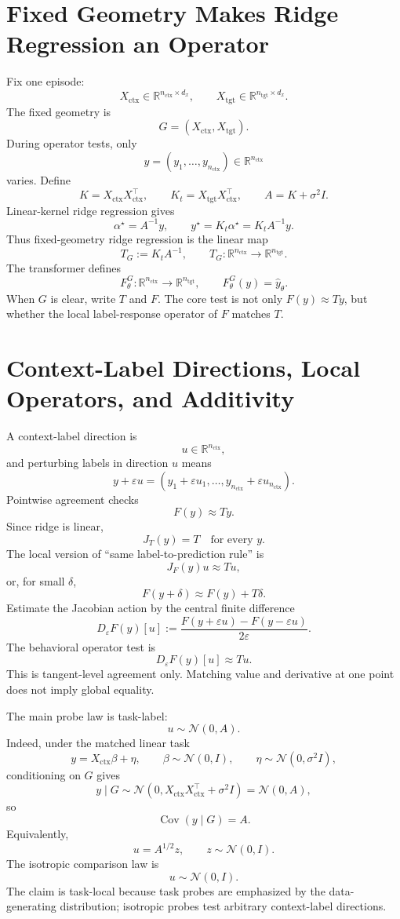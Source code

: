 \documentclass[11pt]{article}
\newcommand{\R}{\mathbb{R}}
\newcommand{\Cov}{\operatorname{Cov}}
\begin{document}
\section{Fixed Geometry Makes Ridge Regression an Operator}

Fix one episode:
\[
X_{\mathrm{ctx}}\in\R^{n_{\mathrm{ctx}}\times d_x},
\qquad
X_{\mathrm{tgt}}\in\R^{n_{\mathrm{tgt}}\times d_x}.
\]
The fixed geometry is
\[
G=(X_{\mathrm{ctx}},X_{\mathrm{tgt}}).
\]
During operator tests, only
\[
y=(y_1,\ldots,y_{n_{\mathrm{ctx}}})\in\R^{n_{\mathrm{ctx}}}
\]
varies. Define
\[
K=X_{\mathrm{ctx}}X_{\mathrm{ctx}}^\top,\qquad
K_t=X_{\mathrm{tgt}}X_{\mathrm{ctx}}^\top,\qquad
A=K+\sigma^2 I.
\]
Linear-kernel ridge regression gives
\[
\alpha^\star=A^{-1}y,\qquad
y^\star=K_t\alpha^\star=K_tA^{-1}y.
\]
Thus fixed-geometry ridge regression is the linear map
\[
T_G:=K_tA^{-1},
\qquad
T_G:\R^{n_{\mathrm{ctx}}}\to\R^{n_{\mathrm{tgt}}}.
\]
The transformer defines
\[
F_\theta^G:\R^{n_{\mathrm{ctx}}}\to\R^{n_{\mathrm{tgt}}},
\qquad
F_\theta^G(y)=\widehat y_\theta.
\]
When \(G\) is clear, write \(T\) and \(F\). The core test is not only \(F(y)\approx Ty\), but
whether the local label-response operator of \(F\) matches \(T\).

\section{Context-Label Directions, Local Operators, and Additivity}

A context-label direction is
\[
u\in\R^{n_{\mathrm{ctx}}},
\]
and perturbing labels in direction \(u\) means
\[
y+\varepsilon u
=
(y_1+\varepsilon u_1,\ldots,y_{n_{\mathrm{ctx}}}+\varepsilon u_{n_{\mathrm{ctx}}}).
\]
Pointwise agreement checks
\[
F(y)\approx Ty.
\]
Since ridge is linear,
\[
J_T(y)=T\quad\text{for every }y.
\]
The local version of ``same label-to-prediction rule'' is
\[
J_F(y)u\approx Tu,
\]
or, for small \(\delta\),
\[
F(y+\delta)\approx F(y)+T\delta.
\]
Estimate the Jacobian action by the central finite difference
\[
D_\varepsilon F(y)[u]
:=
\frac{F(y+\varepsilon u)-F(y-\varepsilon u)}{2\varepsilon}.
\]
The behavioral operator test is
\[
D_\varepsilon F(y)[u]\approx Tu.
\]
This is tangent-level agreement only. Matching value and derivative at one point does not imply
global equality.

The main probe law is task-label:
\[
u\sim\mathcal{N}(0,A).
\]
Indeed, under the matched linear task
\[
y=X_{\mathrm{ctx}}\beta+\eta,\qquad
\beta\sim\mathcal{N}(0,I),\qquad
\eta\sim\mathcal{N}(0,\sigma^2I),
\]
conditioning on \(G\) gives
\[
y\mid G\sim\mathcal{N}(0,X_{\mathrm{ctx}}X_{\mathrm{ctx}}^\top+\sigma^2I)
=\mathcal{N}(0,A),
\]
so
\[
\Cov(y\mid G)=A.
\]
Equivalently,
\[
u=A^{1/2}z,\qquad z\sim\mathcal{N}(0,I).
\]
The isotropic comparison law is
\[
u\sim\mathcal{N}(0,I).
\]
The claim is task-local because task probes are emphasized by the data-generating distribution;
isotropic probes test arbitrary context-label directions.
\end{document}
